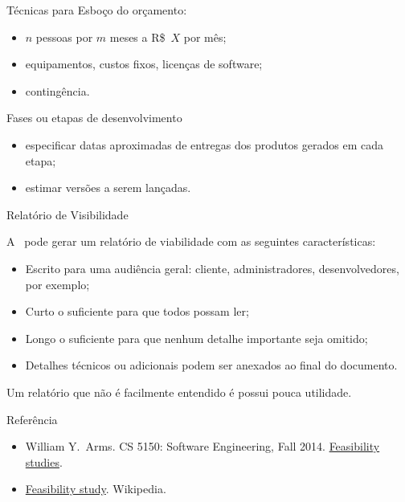\begin{frame}{Técnicas para \insertlecture}
  \alert{Esboço do orçamento:}
  \begin{itemize}[<+->]
  \item $n$ pessoas por $m$ meses a R\$~$X$ por mês;
  \item equipamentos, custos fixos, licenças de software;
  \item contingência.
  \end{itemize}
  
  \pause\bigskip
  
  \alert{Fases ou etapas de desenvolvimento}
  \begin{itemize}
  \item especificar datas aproximadas de entregas dos produtos gerados em cada etapa;
  \item estimar versões a serem lançadas.
  \end{itemize}  
\end{frame}

\begin{frame}{Relatório de Visibilidade}
  
  A \insertlecture\ pode gerar um \alert{relatório de viabilidade} com 
as seguintes características:

\begin{itemize}
\item Escrito para uma audiência geral: cliente, administradores, desenvolvedores, por exemplo;
\item Curto o suficiente para que todos possam ler;
\item Longo o suficiente para que nenhum detalhe importante seja omitido;
\item Detalhes técnicos ou adicionais podem ser anexados ao final do documento.
\end{itemize}

\pause\bigskip

Um relatório que não é facilmente entendido é possui pouca utilidade.

\end{frame}

\begin{frame}{Referência}
  \begin{itemize}
  \item William Y.\ Arms. CS 5150: Software Engineering, Fall 2014. \href{http://www.cs.cornell.edu/courses/cs5150/2014fa/slides/C1-feasibility.pdf}{Feasibility studies}.
  \item \href{https://goo.gl/tpVxoD}{Feasibility study}. Wikipedia.
  \end{itemize}
\end{frame}